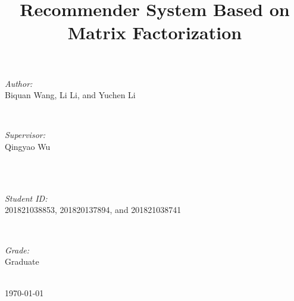\documentclass[journal, a4paper]{IEEEtran}
\begin{document}
\begin{titlepage}
\begin{minipage}{0.4\textwidth}
\begin{flushleft} \large
\emph{Author:}\\
Biquan Wang, Li Li, and Yuchen Li%
\end{flushleft}
\end{minipage}
~
\begin{minipage}{0.4\textwidth}
\begin{flushright} \large
\emph{Supervisor:} \\
Qingyao Wu %
\end{flushright}
\end{minipage}\\[2cm]
~
\begin{minipage}{0.4\textwidth}
\begin{flushleft} \large
\emph{Student ID:}\\
201821038853, 201820137894, and 201821038741
\end{flushleft}
\end{minipage}
~
\begin{minipage}{0.4\textwidth}
\begin{flushright} \large
\emph{Grade:} \\
Graduate
\end{flushright}
\end{minipage}\\[2cm]



{\large \today}\\[2cm] %

 

\vfill %

\end{titlepage}

	\title{Recommender System Based on Matrix Factorization}
	\maketitle
\end{document}
